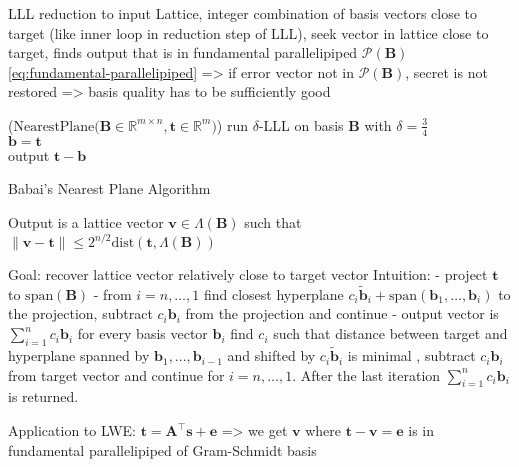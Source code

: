 LLL reduction to input Lattice, integer combination of basis vectors close to target (like inner loop in reduction step of LLL), seek vector in lattice close to target, finds output that is in fundamental parallelipiped $\mathcal{P}(\mathbf{B})$ \cref{eq:fundamental-parallelipiped} => if error vector not in $\mathcal{P}(\mathbf{B})$, secret is not restored %
=> basis quality has to be sufficiently good
\begin{algorithm2e}
\Begin($\text{NearestPlane} {(}\mathbf{B} \in \mathbb{R}^{m \times n},\mathbf{t}\in \mathbb{R}^{m}{)}$)
{
  run $\delta$-LLL on basis $\mathbf{B}$ with $\delta=\frac{3}{4}$\\ %
  $\mathbf{b} = \mathbf{t}$\\
  output $\mathbf{t} - \mathbf{b}$
}
\caption{Babai's Nearest Plane Algorithm \cite{Bab85}}\label{alg:babai} %
\end{algorithm2e}

Output is a lattice vector $\mathbf{v} \in \Lambda(\mathbf{B})$ such that $\|\mathbf{v} - \mathbf{t}\| \leq 2^{n/2} \text{dist}(\mathbf{t}, \Lambda(\mathbf{B}))$ %

Goal: recover lattice vector relatively close to target vector
Intuition:
 - project $\mathbf{t}$ to $\text{span}(\mathbf{B})$
 - from $i=n, \dots, 1$ find closest hyperplane $c_i \tilde{\mathbf{b}}_i + \text{span}(\mathbf{b}_1, \dots, \mathbf{b}_i)$ to the projection, subtract $c_i \mathbf{b}_i$ from the projection and continue %
 - output vector is $\sum_{i=1}^n c_i \mathbf{b}_i$
for every basis vector $\mathbf{b}_i$ find $c_i$ such that distance between target and hyperplane spanned by $\mathbf{b}_1, ..., \mathbf{b}_{i-1}$ and shifted by $c_i \tilde{\mathbf{b}}_i$  is minimal %
, subtract $c_i \mathbf{b}_i$ from target vector and continue for $i=n, \dots, 1$. After the last iteration $\sum_{i=1}^n  c_i \mathbf{b}_i$ is returned. 

Application to LWE: $\mathbf{t} = \mathbf{A}^\intercal\mathbf{s}+\mathbf{e}$ => we get $\mathbf{v}$ where $\mathbf{t}- \mathbf{v} = \mathbf{e}$ is in fundamental parallelipiped of Gram-Schmidt basis


